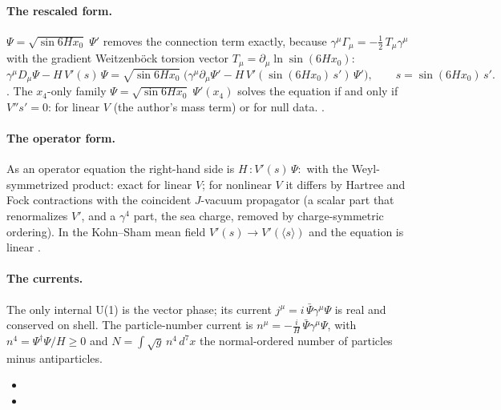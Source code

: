 \paragraph{The rescaled form.} $\Psi=\sqrt{\sin 6Hx_0}\;\Psi'$ removes the connection term exactly,
because $\gamma^\mu\Gamma_\mu=-\tfrac12\,T_\mu\gamma^\mu$ with the gradient Weitzenb\"ock torsion vector
$T_\mu=\partial_\mu\ln\sin(6Hx_0)$:
\[
  \gamma^\mu D_\mu\Psi-H\,V'(s)\,\Psi=\sqrt{\sin 6Hx_0}\;\bigl(\gamma^\mu\partial_\mu\Psi'-H\,V'(\sin(6Hx_0)\,s')\,\Psi'\bigr),
  \qquad s=\sin(6Hx_0)\,s' .
\]
 .
The $x_4$-only family $\Psi=\sqrt{\sin 6Hx_0}\;\Psi'(x_4)$ solves the equation if and only if $V''s'=0$:
for linear $V$ (the author's mass term) or for null data. 
.

\paragraph{The operator form.} As an operator equation the right-hand side is $H\,{:}V'(s)\,\Psi{:}$
with the Weyl-symmetrized product: exact for linear $V$; for nonlinear $V$ it differs by Hartree and Fock
contractions with the coincident $J$-vacuum propagator (a scalar part that renormalizes $V'$, and a
$\gamma^4$ part, the sea charge, removed by charge-symmetric ordering). In the Kohn--Sham mean field
$V'(s)\to V'(\langle s\rangle)$ and the equation is linear .

\paragraph{The currents.} The only internal U(1) is the vector phase; its current
$j^\mu=i\,\bar\Psi\gamma^\mu\Psi$ is real and conserved on shell. The particle-number current is
$n^\mu=-\frac iH\,\bar\Psi\gamma^\mu\Psi$, with $n^4=\Psi^{\dagger}\Psi/H\geq0$ and
$N=\int\sqrt g\,n^4\,d^7x$ the normal-ordered number of particles minus antiparticles.
\begin{itemize}
  \item {}
  \item {}
\end{itemize}

